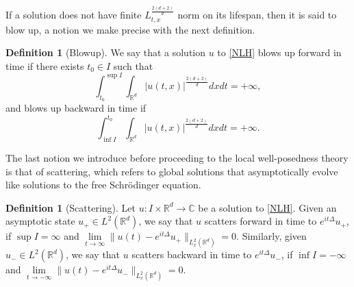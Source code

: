 \documentclass[reqno,11pt]{amsart}
\theoremstyle{plain}
\theoremstyle{definition}
\newtheorem{definition}[theorem]{Definition}
\numberwithin{equation}{section}
\numberwithin{theorem}{section}
\begin{document}
If a solution does not have finite $L_{t,x}^{\frac{2(d+2)}{d}}$  norm on its lifespan, then it is said to blow up, a notion we make precise with the next definition. 
    \begin{definition}[Blowup]
We say that a solution $u$ to \eqref{NLH} blows up forward in time if there exists $t_0\in I$ such that
\[
\int_{t_0}^{\sup I}\int_{\mathbb{R}^d}|u(t,x)|^{\frac{2(d+2)}d}dxdt = +\infty,
\]
and blows up backward in time if
\[
\int_{\inf I}^{t_0}\int_{\mathbb{R}^d}|u(t,x)|^{\frac{2(d+2)}d}dxdt = +\infty.
\]
\end{definition}

The last notion we introduce before proceeding to the local well-posedness theory is that of scattering, which refers to global solutions that asymptotically evolve like solutions to the free Schr\"odinger equation.
\begin{definition}[Scattering]
    Let $ u : I \times \mathbb{R}^d \to \mathbb{C} $ be a solution to \eqref{NLH}. Given an asymptotic state $ u_+ \in L^2(\mathbb{R}^d) $, we say that $ u $ scatters forward in time to $ e^{it\Delta} u_+ $, if $ \sup I = \infty $ and $ \lim\limits_{t \to \infty} \|u(t) - e^{it\Delta} u_+\|_{L_x^2(\mathbb{R}^d)} = 0 $. Similarly, given $ u_- \in L^2(\mathbb{R}^d) $, we say that $ u $ scatters backward in time to $ e^{it\Delta} u_- $, if $ \inf I = -\infty $ and $ \lim\limits_{t \to -\infty} \|u(t) - e^{it\Delta} u_-\|_{L_x^2(\mathbb{R}^d)} = 0 $.
\end{definition}
\end{document}
